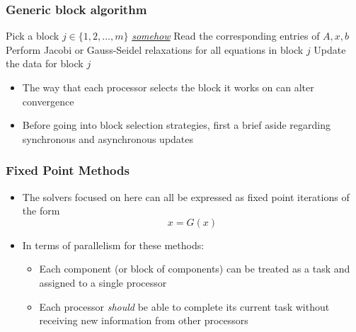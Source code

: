 \documentclass{beamer}
\begin{document}
\begin{frame}
	\frametitle{Generic block algorithm}
	\begin{algorithm}[H]
		\DontPrintSemicolon
		 {
			 {
				Pick a block $j \in \{1, 2, \ldots, m\}$ {\em{\underline{somehow}}} \; 
				Read the corresponding entries of $A, x, b$ \;
				Perform Jacobi or Gauss-Seidel relaxations for all equations in block $j$ \;
				Update the data for block $j$ \;
			}
		}
	\end{algorithm}
	\begin{itemize}
		\item The way that each processor selects the block it works on can alter convergence
		\item Before going into block selection strategies, first a brief aside regarding synchronous and asynchronous updates
	\end{itemize}
\end{frame}


\begin{frame}
	\frametitle{Fixed Point Methods}
	\begin{itemize}
		\item The solvers focused on here can all be expressed as fixed point iterations of the form
			\begin{equation}
				x = G(x)
			\end{equation}
		\item In terms of parallelism for these methods:
		\begin{itemize}
			\item Each component (or block of components) can be treated as a task and assigned to a single processor
			\item Each processor {\em should} be able to complete its current task without receiving new information from other processors 
		\end{itemize}
	\end{itemize}
\end{frame}
\end{document}
